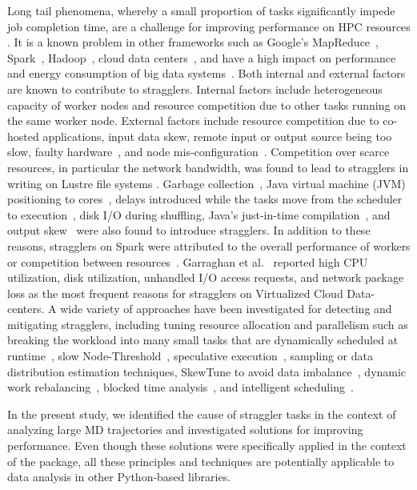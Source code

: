 Long tail phenomena, whereby a small proportion of tasks significantly impede job completion time, are a challenge for improving performance on HPC resources \cite{Garraghan2016}.
It is a known problem in other frameworks such as Google's MapReduce~\cite{Dean2004}, Spark~\cite{Kyong2017,Ousterhout2017,Gittens2016}, Hadoop~\cite{Dean2004}, cloud data centers~\cite{Schmidt2016}, and have a high impact on performance and energy consumption of big data systems~\cite{Tien-2017}.
Both internal and external factors are known to contribute to stragglers. 
Internal factors include heterogeneous capacity of worker nodes and resource competition due to other tasks running on the same worker node.
External factors include resource competition due to co-hosted applications, input data skew, remote input or output source being too slow,  faulty hardware~\cite{Chen2014,Dean2004}, and node mis-configuration~\cite{Dean2004}.
Competition over scarce resources, in particular the network bandwidth, was found to lead to stragglers in writing on Lustre file systems \cite{Xie:2012aa}.
Garbage collection~\cite{Kyong2017,Ousterhout2017}, Java virtual machine (JVM) positioning to cores~\cite{Kyong2017}, delays introduced while the tasks move from the scheduler to execution~\cite{Gittens2016}, disk I/O during shuffling, Java's just-in-time compilation~\cite{Ousterhout2017}, and output skew~\cite{Ousterhout2017} were also found to introduce stragglers.
In addition to these reasons, stragglers on Spark were attributed to the overall performance of workers or competition between resources~\cite{Yang2016}.
Garraghan et al.~\cite{Garraghan2016} reported high CPU utilization, disk utilization, unhandled I/O access requests, and network package loss as the most frequent reasons for stragglers on Virtualized Cloud Data-centers.
A wide variety of approaches have been investigated for detecting and mitigating stragglers, including tuning resource allocation and parallelism such as breaking the workload into many small tasks that are dynamically scheduled at runtime~\cite{Rosen2012}, slow Node-Threshold~\cite{Dean2004}, speculative execution~\cite{Dean2004}, sampling or data distribution estimation techniques, SkewTune to avoid data imbalance~\cite{Kwon2012}, dynamic work rebalancing~\cite{Schmidt2016}, blocked time analysis~\cite{Ousterhout2015}, and intelligent scheduling~\cite{AWE-WQ2014}. 

In the present study, we identified the cause of straggler tasks in the context of analyzing large MD trajectories and investigated solutions for improving performance.
Even though these solutions were specifically applied in the context of the  package, all these principles and  techniques are potentially applicable to data analysis in other Python-based libraries.

